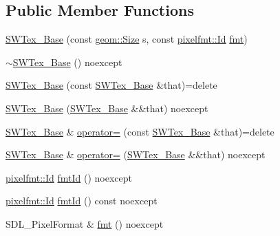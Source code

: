 \subsection*{Public Member Functions}
\begin{DoxyCompactItemize}
\item 
\mbox{\hyperlink{classrolmodl_1_1_s_w_tex___base_a5143f1794e13d2fd117536ac8e731268}{S\+W\+Tex\+\_\+\+Base}} (const \mbox{\hyperlink{structrolmodl_1_1geom_1_1_size}{geom\+::\+Size}} s, const \mbox{\hyperlink{namespacerolmodl_1_1pixelfmt_a96282713e4465ba9211c8fd3a702b52b}{pixelfmt\+::\+Id}} \mbox{\hyperlink{classrolmodl_1_1_s_w_tex___base_a71436a7fc7e3be9c94d55e772ceb25fa}{fmt}})
\item 
\mbox{\hyperlink{classrolmodl_1_1_s_w_tex___base_afd822a8f9134dddfa9e17e8a57734460}{$\sim$\+S\+W\+Tex\+\_\+\+Base}} () noexcept
\item 
\mbox{\hyperlink{classrolmodl_1_1_s_w_tex___base_a18b96903a2b22c5864f4d312b70eef03}{S\+W\+Tex\+\_\+\+Base}} (const \mbox{\hyperlink{classrolmodl_1_1_s_w_tex___base}{S\+W\+Tex\+\_\+\+Base}} \&that)=delete
\item 
\mbox{\hyperlink{classrolmodl_1_1_s_w_tex___base_a5d72a25bfa5454c63b88339a9d9ac2d3}{S\+W\+Tex\+\_\+\+Base}} (\mbox{\hyperlink{classrolmodl_1_1_s_w_tex___base}{S\+W\+Tex\+\_\+\+Base}} \&\&that) noexcept
\item 
\mbox{\hyperlink{classrolmodl_1_1_s_w_tex___base}{S\+W\+Tex\+\_\+\+Base}} \& \mbox{\hyperlink{classrolmodl_1_1_s_w_tex___base_a9185fe7d717066f2bddaa4be4c616dd4}{operator=}} (const \mbox{\hyperlink{classrolmodl_1_1_s_w_tex___base}{S\+W\+Tex\+\_\+\+Base}} \&that)=delete
\item 
\mbox{\hyperlink{classrolmodl_1_1_s_w_tex___base}{S\+W\+Tex\+\_\+\+Base}} \& \mbox{\hyperlink{classrolmodl_1_1_s_w_tex___base_a558a069564ed74e25fc82afe5ce2cbcd}{operator=}} (\mbox{\hyperlink{classrolmodl_1_1_s_w_tex___base}{S\+W\+Tex\+\_\+\+Base}} \&\&that) noexcept
\item 
\mbox{\hyperlink{namespacerolmodl_1_1pixelfmt_a96282713e4465ba9211c8fd3a702b52b}{pixelfmt\+::\+Id}} \mbox{\hyperlink{classrolmodl_1_1_s_w_tex___base_ad24ca500f852f0335ae357e3c9ecd90f}{fmt\+Id}} () noexcept
\item 
\mbox{\hyperlink{namespacerolmodl_1_1pixelfmt_a96282713e4465ba9211c8fd3a702b52b}{pixelfmt\+::\+Id}} \mbox{\hyperlink{classrolmodl_1_1_s_w_tex___base_a81c2b5ec2118d474d747c7a20bf466e0}{fmt\+Id}} () const noexcept
\item 
S\+D\+L\+\_\+\+Pixel\+Format \& \mbox{\hyperlink{classrolmodl_1_1_s_w_tex___base_a71436a7fc7e3be9c94d55e772ceb25fa}{fmt}} () noexcept

\end{DoxyCompactItemize}
